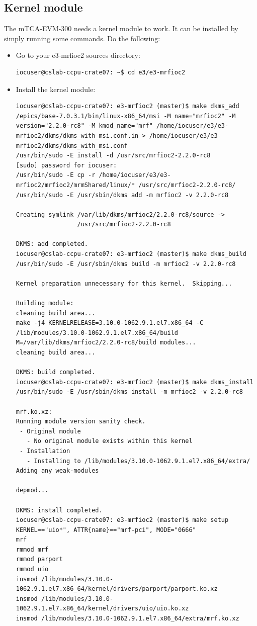 \documentclass[11pt
  , a4paper
  , article
  , oneside
  , showtrims
]{memoir}
\begin{document}
\subsection{Kernel module}
The mTCA-EVM-300 needs a kernel module to work. It can be installed by simply running some commands. Do the following:
\begin{itemize}
\item Go to your e3-mrfioc2 sources directory:
\begin{lstlisting}[style=termstyle]
iocuser@cslab-ccpu-crate07: ~$ cd e3/e3-mrfioc2
\end{lstlisting}
\item Install the kernel module:
\begin{lstlisting}[style=termstyle]
iocuser@cslab-ccpu-crate07: e3-mrfioc2 (master)$ make dkms_add
/epics/base-7.0.3.1/bin/linux-x86_64/msi -M name="mrfioc2" -M  version="2.2.0-rc8" -M kmod_name="mrf" /home/iocuser/e3/e3-mrfioc2/dkms/dkms_with_msi.conf.in > /home/iocuser/e3/e3-mrfioc2/dkms/dkms_with_msi.conf
/usr/bin/sudo -E install -d /usr/src/mrfioc2-2.2.0-rc8
[sudo] password for iocuser:
/usr/bin/sudo -E cp -r /home/iocuser/e3/e3-mrfioc2/mrfioc2/mrmShared/linux/* /usr/src/mrfioc2-2.2.0-rc8/
/usr/bin/sudo -E /usr/sbin/dkms add -m mrfioc2 -v 2.2.0-rc8

Creating symlink /var/lib/dkms/mrfioc2/2.2.0-rc8/source ->
                 /usr/src/mrfioc2-2.2.0-rc8

DKMS: add completed.
iocuser@cslab-ccpu-crate07: e3-mrfioc2 (master)$ make dkms_build
/usr/bin/sudo -E /usr/sbin/dkms build -m mrfioc2 -v 2.2.0-rc8

Kernel preparation unnecessary for this kernel.  Skipping...

Building module:
cleaning build area...
make -j4 KERNELRELEASE=3.10.0-1062.9.1.el7.x86_64 -C /lib/modules/3.10.0-1062.9.1.el7.x86_64/build M=/var/lib/dkms/mrfioc2/2.2.0-rc8/build modules...
cleaning build area...

DKMS: build completed.
iocuser@cslab-ccpu-crate07: e3-mrfioc2 (master)$ make dkms_install
/usr/bin/sudo -E /usr/sbin/dkms install -m mrfioc2 -v 2.2.0-rc8

mrf.ko.xz:
Running module version sanity check.
 - Original module
   - No original module exists within this kernel
 - Installation
   - Installing to /lib/modules/3.10.0-1062.9.1.el7.x86_64/extra/
Adding any weak-modules

depmod...

DKMS: install completed.
iocuser@cslab-ccpu-crate07: e3-mrfioc2 (master)$ make setup
KERNEL=="uio*", ATTR{name}=="mrf-pci", MODE="0666"
mrf
rmmod mrf
rmmod parport
rmmod uio
insmod /lib/modules/3.10.0-1062.9.1.el7.x86_64/kernel/drivers/parport/parport.ko.xz
insmod /lib/modules/3.10.0-1062.9.1.el7.x86_64/kernel/drivers/uio/uio.ko.xz
insmod /lib/modules/3.10.0-1062.9.1.el7.x86_64/extra/mrf.ko.xz



\end{lstlisting}
\end{itemize}
\end{document}
